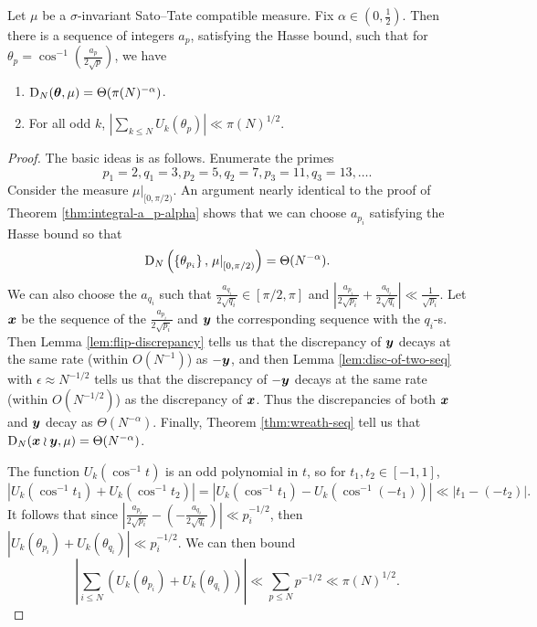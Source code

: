 \begin{theorem}\label{thm:int-flip-seq}
Let $\mu$ be a $\sigma$-invariant Sato--Tate compatible measure. Fix 
$\alpha\in \left(0,\frac 1 2\right)$. Then there is a sequence of integers 
$a_p$, satisfying the Hasse bound, such that for 
$\theta_p =\cos^{-1}\left( \frac{a_p}{2\sqrt p}\right)$, we have
\begin{enumerate}
\item
$\operatorname{D}_N({\boldsymbol\theta},\mu) = \Theta(\pi(N)^{-\alpha})$. 

\item
For all odd $k$, 
$\left| \sum_{k\leqslant N} U_k(\theta_p)\right| \ll \pi(N)^{1/2}$. 
\end{enumerate}
\end{theorem}
\begin{proof}
The basic ideas is as follows. Enumerate the primes 
\[
	p_1 = 2, q_1 = 3, p_2 = 5, q_2 = 7, p_3 = 11, q_3 = 13, \dots .
\]
Consider the measure $\left.\mu\right|_{[0,\pi/2)}$. An argument 
nearly identical to the proof of Theorem \ref{thm:integral-a_p-alpha} shows 
that we can choose $a_{p_i}$ satisfying the Hasse bound so that 
\[
	\operatorname{D}_N\left( \left\{\theta_{p_i}\right\},\left.\mu\right|_{[0,\pi/2)}\right) = \Theta(N^{-\alpha}) .
\]
We can also choose the $a_{q_i}$ such that 
$\frac{a_{q_i}}{2\sqrt{q_i}}\in [\pi/2,\pi]$ and 
$\left| \frac{a_{p_i}}{2\sqrt{p_i}} + \frac{a_{q_i}}{2\sqrt{q_i}}\right| \ll \frac{1}{\sqrt{p_i}}$. 
Let ${\boldsymbol x}$ be the sequence of the $\frac{a_{p_i}}{2\sqrt{p_i}}$ and ${\boldsymbol y}$  
the corresponding sequence with the $q_i$-s. Then 
Lemma \ref{lem:flip-discrepancy} tells us that the discrepancy of 
${\boldsymbol y}$ decays at the same rate (within $O(N^{-1})$) as $-{\boldsymbol y}$, and then Lemma  \ref{lem:disc-of-two-seq} with $\epsilon\approx N^{-1/2}$ tells us that 
the discrepancy of $-{\boldsymbol y}$ decays at the same rate (within $O(N^{-1/2})$) as 
the discrepancy of ${\boldsymbol x}$. Thus the discrepancies of both ${\boldsymbol x}$ and ${\boldsymbol y}$ decay 
as $\Theta(N^{-\alpha})$. Finally, Theorem \ref{thm:wreath-seq} tell us that 
$\operatorname{D}_N({\boldsymbol x}\wr{\boldsymbol y},\mu) = \Theta(N^{-\alpha})$. 

The function $U_k(\cos^{-1} t)$ is an odd polynomial in $t$, so for 
$t_1,t_2\in [-1,1]$, 
\[
	|U_k(\cos^{-1} t_1) + U_k(\cos^{-1} t_2)| = |U_k(\cos^{-1} t_1) - U_k(\cos^{-1}(-t_1))| \ll |t_1 - (-t_2)|.
\]
It follows that since 
$\left|\frac{a_{p_i}}{2\sqrt{p_i}} - \left(- \frac{a_{q_i}}{2\sqrt{q_i}}\right)\right| \ll p_i^{-1/2}$, 
then $|U_k(\theta_{p_i}) + U_k(\theta_{q_i})|\ll p_i^{-1/2}$. 
We can then bound 
\[
	\left| \sum_{i\leqslant N} \left(U_k(\theta_{p_i}) + U_k(\theta_{q_i})\right)\right| \ll \sum_{p\leqslant N} p^{-1/2} \ll \pi(N)^{1/2} .
\]
\end{proof}

